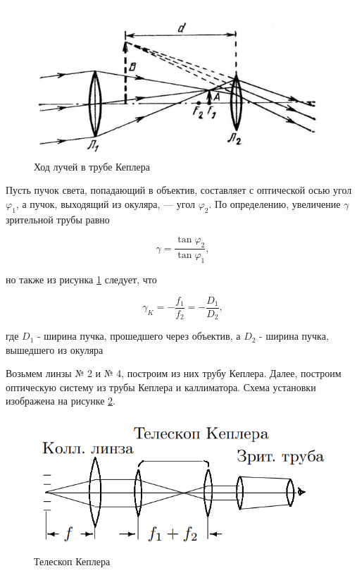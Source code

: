 \documentclass[a4paper, 12pt]{article}
\begin{document}
\begin{figure}[h]
    \centering
    \includegraphics[scale=0.7]{kepler.png}
    \caption{Ход лучей в трубе Кеплера}
    \label{img:rays_way_kepler}
\end{figure}

Пусть пучок света, попадающий в объектив, составляет с оптической осью угол $\varphi_1$, а пучок, выходящий из окуляра, — угол $\varphi_2$. По определению, увеличение $\gamma$ зрительной трубы равно

\begin{equation}
    \gamma = \frac{\tan \varphi_2}{\tan \varphi_1},
\end{equation}

но также из рисунка \ref{img:rays_way_kepler} следует, что 

\begin{equation}
    \label{eq:kep_gamma_by_focuses_diams}
    \gamma_K = -\frac{f_1}{f_2} = -\frac{D_1}{D_2},
\end{equation}

где $D_1$ - ширина пучка, прошедшего через объектив, а $D_2$ - ширина пучка, вышедшего из окуляра

Возьмем линзы № 2 и № 4, построим из них трубу Кеплера. Далее, построим оптическую систему из трубы Кеплера и каллиматора. Схема установки изображена на рисунке \ref{img:setup_kepler}.

\begin{figure}[h]
    \centering
    \includegraphics[scale=0.7]{kepler_setup.png}
    \caption{Телескоп Кеплера}
    \label{img:setup_kepler}
\end{figure}
\end{document}
